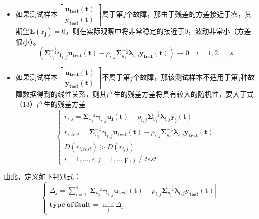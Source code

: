 \documentclass[lang=cn,11pt,a4paper]{elegantpaper}
\begin{document}
\begin{itemize}
	\item 如果测试样本$\left[\begin{array}{c}
		\boldsymbol{u_{test}(t)}\\
		\boldsymbol{y_{test}(t)}
	\end{array}\right]$属于第$j$个故障，那由于残差的方差接近于零，其期望$\boldsymbol{E(r_j)}=0$，则在实际观察中将非常稳定的接近于0，波动非常小（方差很小）。
\begin{equation}
	\left( \boldsymbol{\Sigma}_{u_j}^{-\frac{1}{2}}\boldsymbol{\gamma}_{i,j}\boldsymbol{u_{test}(t)}-\rho_{i,j}\boldsymbol{\Sigma}_{y_j}^{-\frac{1}{2}}\boldsymbol{\lambda}_{i,j}\boldsymbol{y_{test}(t)}\right) \rightarrow 0\quad
	i = 1,2,\ldots,s
\end{equation}
	\item 如果测试样本$\left[\begin{array}{c}
		\boldsymbol{u_{test}(t)}\\
		\boldsymbol{y_{test}(t)}
	\end{array}\right]$不属于第$j$个故障，那该测试样本不适用于第$j$种故障数据得到的线性关系，则其产生的残差方差将具有较大的随机性，要大于式（13）产生的残差方差
\begin{equation}
	\begin{cases}
		r_{i,j} = \boldsymbol{\Sigma}_{u_j}^{-\frac{1}{2}}\boldsymbol{\gamma}_{i,j}\boldsymbol{u_j(t)}-\rho_{i,j}\boldsymbol{\Sigma}_{y_j}^{-\frac{1}{2}}\boldsymbol{\lambda}_{i,j}\boldsymbol{y_j(t)}\\
		r_{i,test} = \boldsymbol{\Sigma}_{u_j}^{-\frac{1}{2}}\boldsymbol{\gamma}_{i,j}\boldsymbol{u_{test}(t)}-\rho_{i,j}\boldsymbol{\Sigma}_{y_j}^{-\frac{1}{2}}\boldsymbol{\lambda}_{i,j}\boldsymbol{y_{test}(t)}\\
		D(r_{i,test})>D(r_{i,j})\\
		i = 1,\ldots,s,j = 1,\ldots \digamma,j\neq test
	\end{cases}
\end{equation}
\end{itemize}
由此，定义如下判别式：
\begin{equation}
	\begin{cases}
		\Delta_j = \sum_{i=1}^{s}\left|\boldsymbol{\Sigma}_{u_j}^{-\frac{1}{2}}\boldsymbol{\gamma}_{i,j}\boldsymbol{u_{test}(t)}-\rho_{i,j}\boldsymbol{\Sigma}_{y_j}^{-\frac{1}{2}}\boldsymbol{\lambda}_{i,j}\boldsymbol{y_{test}(t)}\right|\\
		\boldsymbol{type\ of\ fault} =  \min \limits_{j}\Delta_j
	\end{cases}
\end{equation}
\end{document}
